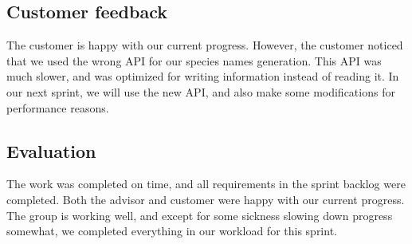 \subsection{Customer feedback}
The customer is happy with our current progress. However, the customer noticed that we used the wrong API for our species names generation. This API was much slower, and was optimized for writing information instead of reading it. In our next sprint, we will use the new API, and also make some modifications for performance reasons.

\subsection{Evaluation}
The work was completed on time, and all requirements in the sprint backlog were completed. Both the advisor and customer were happy with our current progress. The group is working well, and except for some sickness slowing down progress somewhat, we completed everything in our workload for this sprint.

